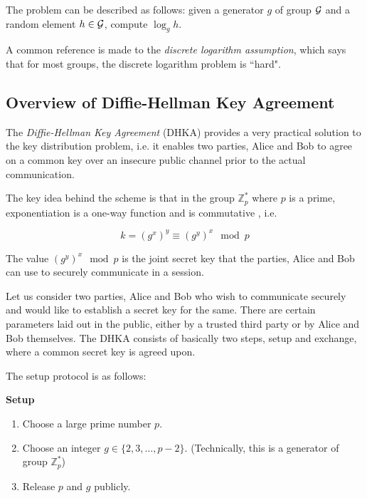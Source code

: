 The problem can be described as follows: given a generator $ g $ of group $ \mathcal{G} $ and a random element $ h \in \mathcal{G} $, compute $ \log_g h $.

A common reference is made to the \textit{discrete logarithm assumption}, which says that for most groups, the discrete logarithm problem is ``hard".

\subsection{Overview of Diffie-Hellman Key Agreement}

\label{subsec:dhka} 

The \emph{Diffie-Hellman Key Agreement} (DHKA) provides a very practical solution to the key distribution problem, i.e. it enables two parties, Alice and Bob to agree on a common key over an insecure public channel prior to the actual communication.

The key idea behind the scheme is that in the group \( \mathbb{Z}^*_p \) where \( p \) is a prime, exponentiation is a one-way function and is commutative \cite{paar2009understanding}, i.e.

\begin{equation}
    k = (g^x)^y \equiv (g^y)^x \mod p
\end{equation}

The value \( (g^y)^x \mod p \) is the joint secret key that the parties, Alice and Bob can use to securely communicate in a session.

Let us consider two parties, Alice and Bob who wish to communicate securely and would like to establish a secret key for the same. 
There are certain parameters laid out in the public, either by a trusted third party or by Alice and Bob themselves. 
The DHKA consists of basically two steps, setup and exchange, where a common secret key is agreed upon.

The setup protocol is as follows:

\begin{tcolorbox}
\textbf{Setup} 

\begin{enumerate}
    \item Choose a large prime number \( p \).
    \item Choose an integer \( g \in \{2, 3, \ldots , p-2\} \). (Technically, this is a generator of group \( \mathbb{Z}^*_p \))
    \item Release \( p \) and \( g \) publicly.
\end{enumerate}
\end{tcolorbox}


